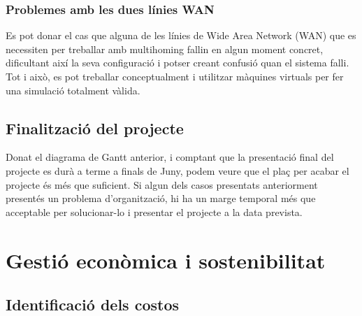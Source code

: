\documentclass[11pt]{article}
\begin{document}
\subsubsection{Problemes amb les dues línies WAN}
Es pot donar el cas que alguna de les línies de Wide Area Network (WAN) que es necessiten per treballar amb multihoming fallin en algun moment concret, dificultant així la seva configuració i potser creant confusió quan el sistema falli. Tot i això, es pot treballar conceptualment i utilitzar màquines virtuals per fer una simulació totalment vàlida.

\subsection{Finalització del projecte}
Donat el diagrama de Gantt anterior, i comptant que la presentació final del projecte es durà a terme a finals de Juny, podem veure que el plaç per acabar el projecte és més que suficient. Si algun dels casos presentats anteriorment presentés un problema d’organització, hi ha un marge temporal més que acceptable per solucionar-lo i presentar el projecte a la data prevista.

\section{Gestió econòmica i sostenibilitat}
\subsection{Identificació dels costos}
\end{document}

